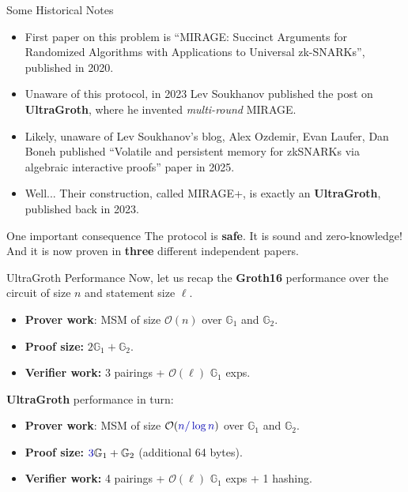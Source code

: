 \documentclass{zkdl-presentation-template}
\begin{document}
\begin{frame}{Some Historical Notes}
    \begin{itemize}
        \item First paper on this problem is
        \textcolor{green!70!black}{``\textsf{MIRAGE}: Succinct Arguments for
        Randomized Algorithms with Applications to Universal zk-SNARKs''},
        published in \textcolor{blue!70!black}{2020}.\pause
        \item Unaware of this protocol, in \textcolor{blue!70!black}{2023} Lev
        Soukhanov published the post on
        \textcolor{green!70!black}{\textbf{UltraGroth}}, where he invented
        \textit{multi-round} MIRAGE.\pause
        \item Likely, unaware of Lev Soukhanov's blog, Alex Ozdemir, Evan
        Laufer, Dan Boneh published \textcolor{green!70!black}{``Volatile and
        persistent memory for zkSNARKs via algebraic interactive proofs''} paper
        in \textcolor{blue!70!black}{2025}.\pause
        \item Well... Their construction, called MIRAGE+, is exactly an
        \textcolor{green!70!black}{\textbf{UltraGroth}}, published back in 2023.\pause
    \end{itemize}

    \begin{block}{One important consequence}
        The protocol is \textbf{safe}. It is sound and zero-knowledge! And it is
        now proven in \textbf{three} different independent papers.
    \end{block}
\end{frame}

\begin{frame}{UltraGroth Performance}
    Now, let us recap the \textcolor{green!70!black}{\textbf{Groth16} performance} over
    the circuit of size $n$ and statement size $\ell$.
    \begin{itemize}
        \item \textbf{Prover work}: MSM of size $\mathcal{O}(n)$ over
        $\mathbb{G}_1$ and $\mathbb{G}_2$.\pause
        \item \textbf{Proof size:} $2\mathbb{G}_1+\mathbb{G}_2$.\pause
        \item \textbf{Verifier work:} 3 pairings + $\mathcal{O}(\ell)$
        $\mathbb{G}_1$ exps.\pause
    \end{itemize}

    \textcolor{blue!70!black}{\textbf{UltraGroth} performance} in turn:
    \begin{itemize}
        \item \textbf{Prover work}: MSM of size
        $\mathcal{O}(\textcolor{blue!70!black}{n/\log n})$ over $\mathbb{G}_1$
        and $\mathbb{G}_2$.\pause
        \item \textbf{Proof size:}
        $\textcolor{blue!70!black}{3}\mathbb{G}_1+\mathbb{G}_2$ (additional 64
        bytes).\pause
        \item \textbf{Verifier work:} \textcolor{blue!70!black}{4} pairings +
        $\mathcal{O}(\ell)$ $\mathbb{G}_1$ exps + \textcolor{blue!70!black}{1
        hashing}.
    \end{itemize}
\end{frame}
\end{document}
